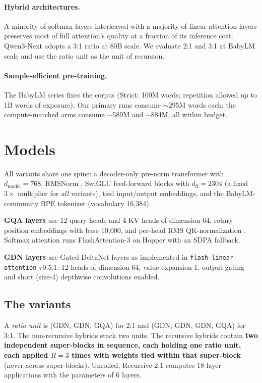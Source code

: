 \documentclass[11pt]{article}
\begin{document}
\paragraph{Hybrid architectures.} A minority of softmax layers interleaved with a majority of linear-attention layers preserves most of full attention's quality at a fraction of its inference cost; Qwen3-Next \citep{qwen2025next} adopts a 3:1 ratio at 80B scale. We evaluate 2:1 and 3:1 at BabyLM scale and use the ratio unit as the unit of recursion.

\paragraph{Sample-efficient pre-training.} The BabyLM series \citep{warstadt2023findings,babylm2026cfp} fixes the corpus (Strict: 100M words; repetition allowed up to 1B words of exposure). Our primary runs consume ${\sim}$295M words each; the compute-matched arms consume ${\sim}$589M and ${\sim}$884M, all within budget.

\section{Models}

All variants share one spine: a decoder-only pre-norm transformer with $d_{\text{model}} = 768$, RMSNorm \citep[$\epsilon = 10^{-5}$]{zhang2019rmsnorm}, SwiGLU feed-forward blocks \citep{shazeer2020glu} with $d_{\text{ff}} = 2304$ (a fixed $3\times$ multiplier for \emph{all} variants), tied input/output embeddings, and the BabyLM-community BPE tokenizer (vocabulary 16{,}384).

\textbf{GQA layers} use 12 query heads and 4 KV heads of dimension 64, rotary position embeddings \citep{su2021roformer} with base 10{,}000, and per-head RMS QK-normalization \citep{henry2020qknorm}. Softmax attention runs FlashAttention-3 \citep{shah2024flashattention3} on Hopper with an SDPA fallback.

\textbf{GDN layers} are Gated DeltaNet layers \citep{yang2025gateddeltanet} as implemented in \texttt{flash-linear-attention} v0.5.1: 12 heads of dimension 64, value expansion 1, output gating and short (size-4) depthwise convolutions enabled.

\subsection{The variants}

A \emph{ratio unit} is (GDN, GDN, GQA) for 2:1 and (GDN, GDN, GDN, GQA) for 3:1. The non-recursive hybrids stack two units. The recursive hybrids contain \textbf{two independent super-blocks in sequence, each holding one ratio unit, each applied $R = 3$ times with weights tied within that super-block} (never across super-blocks). Unrolled, Recursive 2:1 computes 18 layer applications with the parameters of 6 layers.
\end{document}
